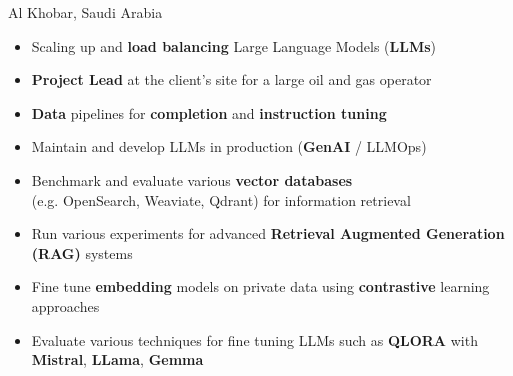 \documentclass[10pt,a4paper,ragged2e]{altacv}
\begin{document}

\begin{fullwidth}
\makecvheader
\end{fullwidth}



     {Al Khobar, Saudi Arabia}

\begin{itemize}
	\item Scaling up and \textbf{load balancing} Large Language Models (\textbf{LLMs})
	\item \textbf{Project Lead} at the client's site for a large oil and gas operator
	\item \textbf{Data} pipelines for \textbf{completion} and \textbf{instruction tuning} 
	\item Maintain and develop LLMs in production (\textbf{GenAI} / LLMOps)
	\item Benchmark and evaluate various \textbf{vector databases} \\(e.g. OpenSearch, Weaviate, Qdrant) for information retrieval
	\item Run various experiments for advanced \textbf{Retrieval Augmented Generation (RAG)} systems
	\item Fine tune \textbf{embedding} models on private data using \textbf{contrastive} learning approaches
	\item Evaluate various techniques for fine tuning LLMs such as \textbf{QLORA} with \textbf{Mistral}, \textbf{LLama}, \textbf{Gemma}

\end{itemize}
\end{document}
